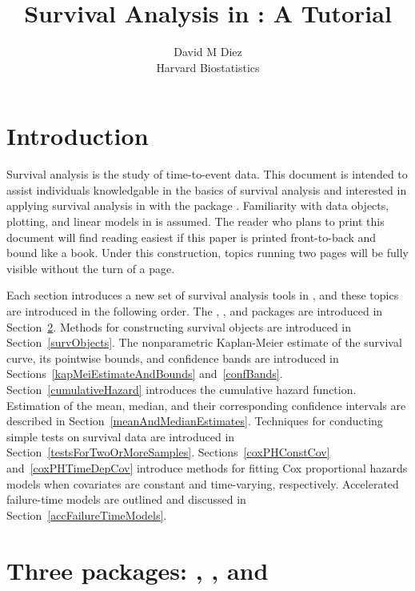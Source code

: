 \documentclass[article]{jss}
\author{David M Diez\\Harvard Biostatistics}
\title{Survival Analysis in \proglang{R}: A Tutorial}
\begin{document}

\section[Introduction]{Introduction}

Survival analysis is the study of time-to-event data. This document is intended to assist individuals knowledgable in the basics of survival analysis and interested in applying survival analysis in  with the  package \citep{survival}. Familiarity with data objects, plotting, and linear models in  is assumed. The reader who plans to print this document will find reading easiest if this paper is printed front-to-back and bound like a book. Under this construction, topics running two pages will be fully visible without the turn of a page.

Each section introduces a new set of survival analysis tools in , and these topics are introduced in the following order. The , , and  packages are introduced in Section~\ref{packagesAndData}. Methods for constructing survival objects are introduced in Section~\ref{survObjects}. The nonparametric Kaplan-Meier estimate of the survival curve, its pointwise bounds, and confidence bands are introduced in Sections~\ref{kapMeiEstimateAndBounds} and~\ref{confBands}. Section~\ref{cumulativeHazard} introduces the cumulative hazard function. Estimation of the mean, median, and their corresponding confidence intervals are described in Section~\ref{meanAndMedianEstimates}. Techniques for conducting simple tests on survival data are introduced in Section~\ref{testsForTwoOrMoreSamples}. Sections~\ref{coxPHConstCov} and~\ref{coxPHTimeDepCov} introduce methods for fitting Cox proportional hazards models when covariates are constant and time-varying, respectively. Accelerated failure-time models are outlined and discussed in Section~\ref{accFailureTimeModels}.

\pagebreak

\section[Three packages]{Three packages: , , and }
\label{packagesAndData}
\end{document}

